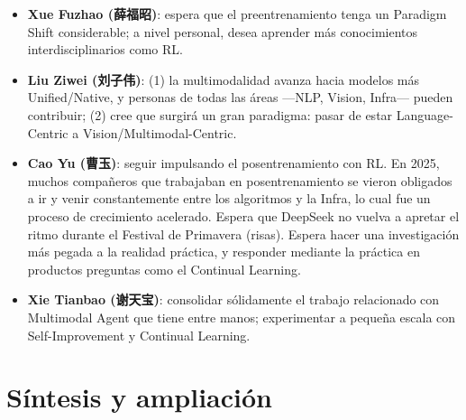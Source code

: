 \documentclass[a4paper]{article}
\begin{document}
\begin{itemize}
  \item \textbf{Xue Fuzhao (薛福昭)}: espera que el preentrenamiento tenga un Paradigm Shift considerable; a nivel personal, desea aprender más conocimientos interdisciplinarios como RL.
  \item \textbf{Liu Ziwei (刘子伟)}: (1) la multimodalidad avanza hacia modelos más Unified/Native, y personas de todas las áreas —NLP, Vision, Infra— pueden contribuir; (2) cree que surgirá un gran paradigma: pasar de estar Language-Centric a Vision/Multimodal-Centric.
  \item \textbf{Cao Yu (曹玉)}: seguir impulsando el posentrenamiento con RL. En 2025, muchos compañeros que trabajaban en posentrenamiento se vieron obligados a ir y venir constantemente entre los algoritmos y la Infra, lo cual fue un proceso de crecimiento acelerado. Espera que DeepSeek no vuelva a apretar el ritmo durante el Festival de Primavera (risas). Espera hacer una investigación más pegada a la realidad práctica, y responder mediante la práctica en productos preguntas como el Continual Learning.
  \item \textbf{Xie Tianbao (谢天宝)}: consolidar sólidamente el trabajo relacionado con Multimodal Agent que tiene entre manos; experimentar a pequeña escala con Self-Improvement y Continual Learning.
\end{itemize}

\section{Síntesis y ampliación}
\end{document}
